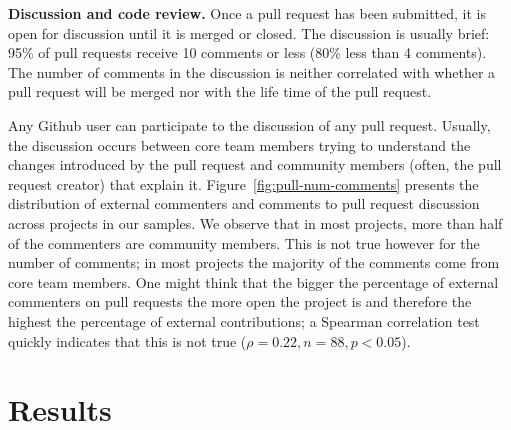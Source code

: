 \documentclass{acm_proc_article-sp}
\begin{document}


\textbf{Discussion and code review.}
Once a pull request has been submitted, it is open for discussion until
it is merged or closed. The discussion is usually brief: 95\% of pull
requests receive 10 comments or less (80\% less than 4 comments). 
The number of comments in the discussion is neither correlated with
whether a pull request will be merged nor with the life time of the
pull request.

Any Github user can participate to the discussion of any pull request. Usually,
the discussion occurs between core team members trying to understand the changes
introduced by the pull request and community members (often, the pull
request creator) that explain it. Figure~\ref{fig:pull-num-comments} presents
the distribution of external commenters and comments to pull request discussion
across projects in our samples. We observe that in most projects, more than half
of the commenters are community members. This is not true however for the number
of comments; in most projects the majority of the comments come from core team
members. One might think that the bigger the percentage of external commenters
on pull requests the more open the project is and therefore the highest the
percentage of external contributions; a Spearman correlation test quickly
indicates that this is not true ($\rho = 0.22, n = 88, p < 0.05$).

\section{Results}
\label{sec:accrej}
\end{document}
